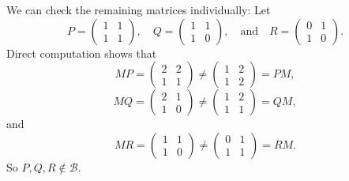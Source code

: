 \begin{solution}
  We can check the remaining matrices individually: Let
  \begin{equation*}
    P = \begin{pmatrix}
      1 & 1\\
      1 & 1
    \end{pmatrix},\quad
    Q = \begin{pmatrix}
      1 & 1\\
      1 & 0
    \end{pmatrix},\quad\text{and}\quad
    R = \begin{pmatrix}
      0 & 1\\
      1 & 0
    \end{pmatrix}.
  \end{equation*}
  Direct computation shows that
  \begin{equation*}
    MP = \begin{pmatrix}
      2 & 2 \\
      1 & 1
    \end{pmatrix}
    \neq
    \begin{pmatrix}
      1 & 2 \\
      1 & 2
    \end{pmatrix}
    = PM,
  \end{equation*}
  \begin{equation*}
    MQ = \begin{pmatrix}
      2 & 1 \\
      1 & 0
    \end{pmatrix}
    \neq
    \begin{pmatrix}
      1 & 2 \\
      1 & 1
    \end{pmatrix}
    = QM,
  \end{equation*}
  and
  \begin{equation*}
    MR = \begin{pmatrix}
      1 & 1 \\
      1 & 0
    \end{pmatrix}
    \neq
    \begin{pmatrix}
      0 & 1 \\
      1 & 1
    \end{pmatrix}
    = RM.
  \end{equation*}
  So $P, Q, R\not\in\mathcal{B}$.
\end{solution}

